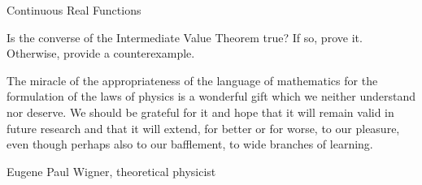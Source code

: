 \begin{section}{Continuous Real Functions}
\begin{problem}
Is the converse of the Intermediate Value Theorem true? If so, prove it.  Otherwise, provide a counterexample.
\end{problem}

\epigraph{The miracle of the appropriateness of the language of mathematics for the formulation of the laws of physics is a wonderful gift which we neither understand nor deserve. We should be grateful for it and hope that it will remain valid in future research and that it will extend, for better or for worse, to our pleasure, even though perhaps also to our bafflement, to wide branches of learning.}{Eugene Paul Wigner, theoretical physicist}

\end{section}